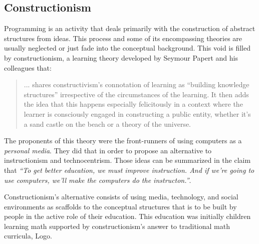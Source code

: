\subsection{Constructionism}

Programming is an activity that deals primarily with the construction
of abstract structures from ideas. This process and some of its encompassing
theories are usually neglected or just fade into the conceptual
background. This void is filled by constructionism, a learning theory
developed by Seymour Papert and his colleagues that:

\begin{quote}
  ... shares constructivism's connotation of learning as ``building
  knowledge structures'' irrespective of the circumstances of the
  learning. It then adds the idea that this happens especially
  felicitously in a context where the learner is consciously engaged in
  constructing a public entity, whether it's a sand castle on the beach
  or a theory of the universe.
  \cite{education:papert__situating_constructionism}
\end{quote}

The proponents of this theory were the front-runners of using
computers as a \emph{personal media}. They did that in order to
propose an alternative to instructionism and technocentrism. Those
ideas can be summarized in the claim that \emph{``To get better
  education, we must improve instruction. And if we're going to use
  computers, we'll make the computers do the
  instructon.''}. \cite{education:papert__constructionism_instructionism} 

Constructionism's alternative consists of using media, technology, and
social environments as scaffolds to the conceptual structures that is
to be built by people in the active role of their education. This
education was initially children learning math supported by
constructionism's answer to traditional math curricula, Logo. 


